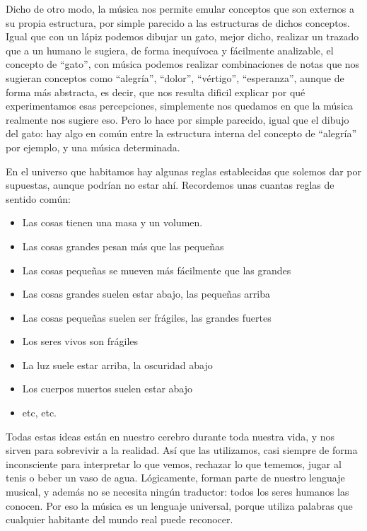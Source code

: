 \documentclass[]{article}
\providecommand{\tightlist}{%
  \setlength{
\itemsep}{0pt}\setlength{\parskip}{0pt}}
\begin{document}
Dicho de otro modo, la música nos permite emular conceptos que son externos a su propia estructura, por simple parecido a las estructuras de dichos conceptos. Igual que con un lápiz podemos dibujar un gato, mejor dicho, realizar un trazado que a un humano le sugiera, de forma inequívoca y fácilmente analizable, el concepto de ``gato'', con música podemos realizar combinaciones de notas que nos sugieran conceptos como ``alegría'', ``dolor'', ``vértigo'', ``esperanza'', aunque de forma más abstracta, es decir, que nos resulta dificil explicar por qué experimentamos esas percepciones, simplemente nos quedamos en que la música realmente nos sugiere eso. Pero lo hace por simple parecido, igual que el dibujo del gato: hay algo en común entre la estructura interna del concepto de ``alegría'' por ejemplo, y una música determinada.

En el universo que habitamos hay algunas reglas establecidas que solemos dar por supuestas, aunque podrían no estar ahí. Recordemos unas cuantas reglas de sentido común:

\begin{itemize}   \tightlist   
\item         Las cosas tienen una masa y un volumen.   
\item         Las cosas grandes pesan más que las pequeñas   
\item         Las cosas pequeñas se mueven más fácilmente que las grandes   
\item         Las cosas grandes suelen estar abajo, las pequeñas arriba   
\item         Las cosas pequeñas suelen ser frágiles, las grandes fuertes   
\item         Los seres vivos son frágiles   
\item         La luz suele estar arriba, la oscuridad abajo   
\item         Los cuerpos muertos suelen estar abajo   
\item         etc, etc. 
\end{itemize}

Todas estas ideas están en nuestro cerebro durante toda nuestra vida, y nos sirven para sobrevivir a la realidad. Así que las         utilizamos, casi siempre de forma inconsciente para interpretar lo que         vemos, rechazar lo que tememos, jugar al tenis o beber un vaso de         agua. Lógicamente, forman parte de nuestro lenguaje musical, y además         no se necesita ningún traductor: todos los seres humanos las conocen.         Por eso la música es un lenguaje universal, porque utiliza palabras         que cualquier habitante del mundo real puede reconocer. 
\end{document}
